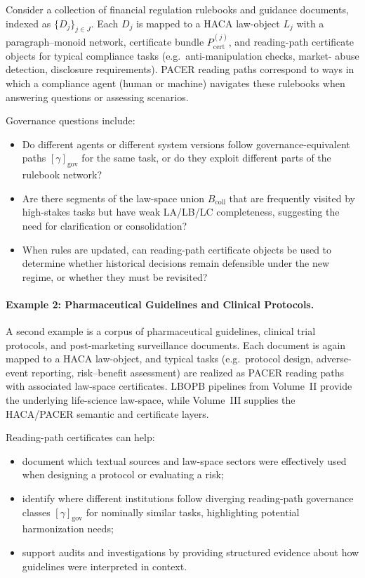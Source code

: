 \documentclass[11pt]{book}
\theoremstyle{plain}
\theoremstyle{definition}
\theoremstyle{remark}
\begin{document}
Consider a collection of financial regulation rulebooks and guidance
documents, indexed as $\{D_j\}_{j\in J}$. Each $D_j$ is mapped to a
HACA law-object $L_j$ with a paragraph–monoid network, certificate
bundle $P_{\mathrm{cert}}^{(j)}$, and reading-path certificate objects
for typical compliance tasks (e.g.\ anti-manipulation checks, market-
abuse detection, disclosure requirements). PACER reading paths
correspond to ways in which a compliance agent (human or machine)
navigates these rulebooks when answering questions or assessing
scenarios.

Governance questions include:
\begin{itemize}
  \item Do different agents or different system versions follow
        governance-equivalent paths $[\gamma]_{\mathrm{gov}}$ for the
        same task, or do they exploit different parts of the rulebook
        network?
  \item Are there segments of the law-space union $B_{\mathrm{coll}}$
        that are frequently visited by high-stakes tasks but have weak
        LA/LB/LC completeness, suggesting the need for clarification
        or consolidation?
  \item When rules are updated, can reading-path certificate objects
        be used to determine whether historical decisions remain
        defensible under the new regime, or whether they must be
        revisited?
\end{itemize}

\paragraph{Example 2: Pharmaceutical Guidelines and Clinical Protocols.}

A second example is a corpus of pharmaceutical guidelines, clinical
trial protocols, and post-marketing surveillance documents. Each
document is again mapped to a HACA law-object, and typical tasks (e.g.\
protocol design, adverse-event reporting, risk–benefit assessment)
are realized as PACER reading paths with associated law-space
certificates. LBOPB pipelines from Volume~II provide the underlying
life-science law-space, while Volume~III supplies the HACA/PACER
semantic and certificate layers.

Reading-path certificates can help:
\begin{itemize}
  \item document which textual sources and law-space sectors were
        effectively used when designing a protocol or evaluating a
        risk;
  \item identify where different institutions follow diverging
        reading-path governance classes $[\gamma]_{\mathrm{gov}}$ for
        nominally similar tasks, highlighting potential harmonization
        needs;
  \item support audits and investigations by providing structured
        evidence about how guidelines were interpreted in context.
\end{itemize}
\end{document}
